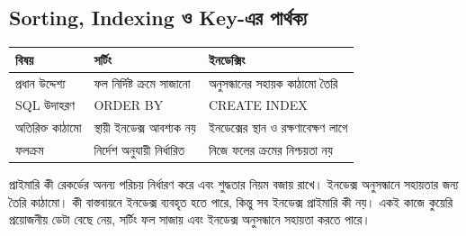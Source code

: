 \subsection{Sorting, Indexing ও Key-এর পার্থক্য}
\begin{flushleft}\small
\begin{tabularx}{\linewidth}{|p{26mm}|X|X|}\hline
বিষয় & সর্টিং & ইনডেক্সিং\\\hline
প্রধান উদ্দেশ্য & ফল নির্দিষ্ট ক্রমে সাজানো & অনুসন্ধানের সহায়ক কাঠামো তৈরি\\\hline
SQL উদাহরণ & ORDER BY & CREATE INDEX\\\hline
অতিরিক্ত কাঠামো & স্থায়ী ইনডেক্স আবশ্যক নয় & ইনডেক্সের স্থান ও রক্ষণাবেক্ষণ লাগে\\\hline
ফলক্রম & নির্দেশ অনুযায়ী নির্ধারিত & নিজে ফলের ক্রমের নিশ্চয়তা নয়\\\hline
\end{tabularx}
\end{flushleft}
প্রাইমারি কী রেকর্ডের অনন্য পরিচয় নির্ধারণ করে এবং শুদ্ধতার নিয়ম বজায় রাখে। ইনডেক্স অনুসন্ধানে সহায়তার জন্য তৈরি কাঠামো। কী বাস্তবায়নে ইনডেক্স ব্যবহৃত হতে পারে, কিন্তু সব ইনডেক্স প্রাইমারি কী নয়। একই কাজে কুয়েরি প্রয়োজনীয় ডেটা বেছে নেয়, সর্টিং ফল সাজায় এবং ইনডেক্স অনুসন্ধানে সহায়তা করতে পারে।

